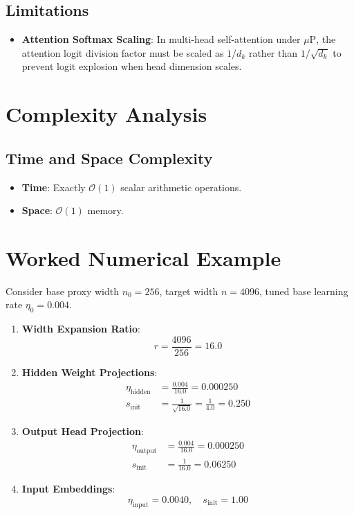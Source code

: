 \documentclass[11pt,a4paper]{article}
\theoremstyle{definition}
\begin{document}
\subsection{Limitations}
\begin{itemize}
    \item \textbf{Attention Softmax Scaling}: In multi-head self-attention under $\mu\text{P}$, the attention logit division factor must be scaled as $1 / d_k$ rather than $1 / \sqrt{d_k}$ to prevent logit explosion when head dimension scales.
\end{itemize}

\section{Complexity Analysis}

\subsection{Time and Space Complexity}
\begin{itemize}
    \item \textbf{Time}: Exactly $\mathcal{O}(1)$ scalar arithmetic operations.
    \item \textbf{Space}: $\mathcal{O}(1)$ memory.
\end{itemize}

\section{Worked Numerical Example}

Consider base proxy width $n_0 = 256$, target width $n = 4096$, tuned base learning rate $\eta_0 = 0.004$.

\begin{enumerate}
    \item \textbf{Width Expansion Ratio}:
    \begin{equation}
    r = \frac{4096}{256} = 16.0
    \end{equation}
    \item \textbf{Hidden Weight Projections}:
    \begin{align}
    \eta_{\text{hidden}} &= \frac{0.004}{16.0} = 0.000250 \\
    s_{\text{init}} &= \frac{1}{\sqrt{16.0}} = \frac{1}{4.0} = 0.250
    \end{align}
    \item \textbf{Output Head Projection}:
    \begin{align}
    \eta_{\text{output}} &= \frac{0.004}{16.0} = 0.000250 \\
    s_{\text{init}} &= \frac{1}{16.0} = 0.06250
    \end{align}
    \item \textbf{Input Embeddings}:
    \begin{equation}
    \eta_{\text{input}} = 0.0040, \quad s_{\text{init}} = 1.00
    \end{equation}
\end{enumerate}
\end{document}
